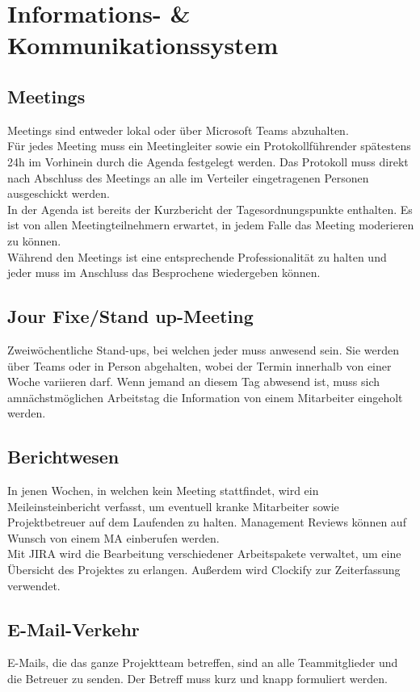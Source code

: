 \documentclass[
	headings=optiontotocandhead,%
	oneside,
	numbers=noenddot,%
	toc=flat, %
	10pt, %
	parskip=full, %
	listof=totoc, %
	listof=flat, %
	numbers=noenddot, %
	bibliography=totoc, %
	a4paper,DIV=14,
]{scrartcl}
\begin{document}
\section{Informations- \& Kommunikationssystem}
\subsection{Meetings}
Meetings sind entweder lokal oder über Microsoft Teams abzuhalten.\\
Für jedes Meeting muss ein Meetingleiter sowie ein Protokollführender spätestens 24h im Vorhinein durch die Agenda festgelegt werden. Das Protokoll muss direkt nach Abschluss des Meetings an alle im Verteiler eingetragenen Personen ausgeschickt werden.\\
In der Agenda ist bereits der Kurzbericht der Tagesordnungspunkte enthalten. Es ist von allen Meetingteilnehmern erwartet, in jedem Falle das Meeting moderieren zu können.\\
Während den Meetings ist eine entsprechende Professionalität zu halten und jeder muss im Anschluss das Besprochene wiedergeben können.

\subsection{Jour Fixe/Stand up-Meeting}
Zweiwöchentliche Stand-ups, bei welchen jeder muss anwesend sein. Sie werden über Teams oder in Person abgehalten, wobei der Termin innerhalb von einer Woche variieren darf. Wenn jemand an diesem Tag abwesend ist, muss sich amnächstmöglichen Arbeitstag die Information von einem Mitarbeiter eingeholt werden.

\subsection{Berichtwesen}
In jenen Wochen, in welchen kein Meeting stattfindet, wird ein Meileinsteinbericht verfasst, um eventuell kranke Mitarbeiter sowie Projektbetreuer auf dem Laufenden zu halten. Management Reviews können auf Wunsch von einem MA einberufen werden. \\
Mit JIRA wird die Bearbeitung verschiedener Arbeitspakete verwaltet, um eine Übersicht des Projektes zu erlangen. Außerdem wird Clockify zur Zeiterfassung verwendet.

\subsection{E-Mail-Verkehr}
E-Mails, die das ganze Projektteam betreffen, sind an alle Teammitglieder und die Betreuer zu senden. 
Der Betreff muss kurz und knapp formuliert werden.
\end{document}
